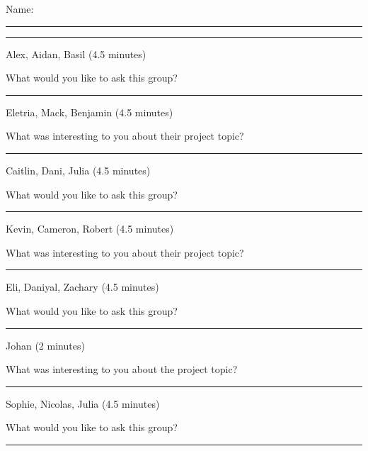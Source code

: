 \documentclass[12pt,letterpaper,noanswers]{exam}
\begin{document}
 \pdfpageheight 11in 
  \pdfpagewidth 8.5in
  
  \noindent Name: \rule{2.5in}{0.5pt}
  \vspace{0.2cm}
  
 
   \hrule
  \vspace{0.1cm}
  
 \noindent Alex, Aidan, Basil (4.5 minutes)
  
 \noindent What would you like to ask this group?
\vfill
 
 \hrule
  \vspace{0.1cm}
  
   \noindent Eletria, Mack, Benjamin
   (4.5 minutes)
 
  \noindent What was interesting to you about their project topic?


\vfill

\hrule
 \vspace{0.1cm}

 
\noindent Caitlin, Dani, Julia (4.5 minutes)
  
 \noindent What would you like to ask this group?
\vfill
 
   \hrule
  \vspace{0.1cm}

\noindent Kevin, Cameron, Robert (4.5 minutes)

  \noindent What was interesting to you about their project topic?


\vfill
 \hrule
  \vspace{0.1cm}
 
 \noindent Eli, Daniyal, Zachary (4.5 minutes)
 
 \noindent What would you like to ask this group?
\vfill

 \hrule
 \vspace{0.1cm}

  
 \noindent Johan (2 minutes)
 
  \noindent What was interesting to you about the project topic?


\vfill
 


   \hrule
  \vspace{0.1cm}

 \eject 
 

\noindent Sophie, Nicolas, Julia (4.5 minutes)

 \noindent What would you like to ask this group?
\vfill

 \hrule
  \vspace{0.1cm}
 
\end{document}
